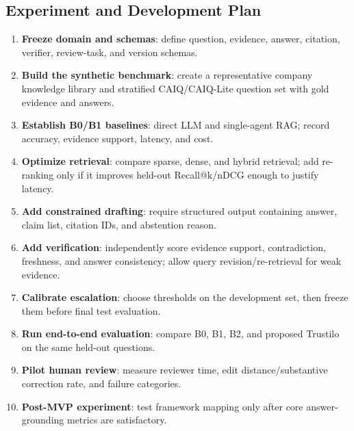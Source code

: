 \documentclass[11pt,journal,onecolumn]{IEEEtran}
\begin{document}
\subsection{Experiment and Development Plan}
\begin{enumerate}[leftmargin=1.7em]
    \item \textbf{Freeze domain and schemas}: define question, evidence, answer, citation, verifier, review-task, and version schemas.
    \item \textbf{Build the synthetic benchmark}: create a representative company knowledge library and stratified CAIQ/CAIQ-Lite question set with gold evidence and answers.
    \item \textbf{Establish B0/B1 baselines}: direct LLM and single-agent RAG; record accuracy, evidence support, latency, and cost.
    \item \textbf{Optimize retrieval}: compare sparse, dense, and hybrid retrieval; add re-ranking only if it improves held-out Recall@k/nDCG enough to justify latency.
    \item \textbf{Add constrained drafting}: require structured output containing answer, claim list, citation IDs, and abstention reason.
    \item \textbf{Add verification}: independently score evidence support, contradiction, freshness, and answer consistency; allow query revision/re-retrieval for weak evidence.
    \item \textbf{Calibrate escalation}: choose thresholds on the development set, then freeze them before final test evaluation.
    \item \textbf{Run end-to-end evaluation}: compare B0, B1, B2, and proposed Trustilo on the same held-out questions.
    \item \textbf{Pilot human review}: measure reviewer time, edit distance/substantive correction rate, and failure categories.
    \item \textbf{Post-MVP experiment}: test framework mapping only after core answer-grounding metrics are satisfactory.
\end{enumerate}
\end{document}
